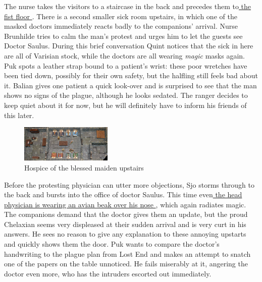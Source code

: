 The nurse takes the visitors to a staircase in the back and precedes them to\hyperref[fig:Hospice-of-the-blessed-maiden-upstairs-515717557]{ the fist floor } . There is a second smaller sick room upstairs, in which one of the masked doctors immediately reacts badly to the companions' arrival. Nurse Brunhilde tries to calm the man's protest and urges him to let the guests see Doctor Saulus. During this brief conversation Quint notices that the sick in here are all of Varisian stock, while the doctors are all wearing  {\itshape magic} masks again. Puk spots a leather strap bound to a patient's wrist: these poor wretches have been tied down, possibly for their own safety, but the halfling still feels bad about it. Balian gives one patient a quick look-over and is surprised to see that the man shows no signs of the plague, although he looks sedated. The ranger decides to keep quiet about it for now, but he will definitely have to inform his friends of this later. \\

\begin{figure}[h]
	\centering
	\includegraphics[width=0.39\textwidth]{images/Hospice-of-the-blessed-maiden-upstairs-515717557.jpg}
	\caption{Hospice of the blessed maiden upstairs}
	\label{fig:Hospice-of-the-blessed-maiden-upstairs-515717557}
\end{figure}

Before the protesting physician can utter more objections, Sjo storms through to the back and bursts into the office of doctor Saulus. This time even\hyperref[fig:Hospice-of-the-blessed-maiden-doctor-515717926]{ the head physician is wearing an avian beak over his nose } , which again radiates magic. The companions demand that the doctor gives them an update, but the proud Chelaxian seems very displeased at their sudden arrival and is very curt in his answers. He sees no reason to give any explanation to these annoying upstarts and quickly shows them the door. Puk wants to compare the doctor's handwriting to the plague plan from Lost End and makes an attempt to snatch one of the papers on the table unnoticed. He fails miserably at it, angering the doctor even more, who has the intruders escorted out immediately. \\

